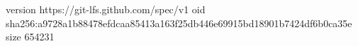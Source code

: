 version https://git-lfs.github.com/spec/v1
oid sha256:a9728a1b88478efdcaa85413a163f25db446e69915bd18901b7424df6b0ca35e
size 654231
